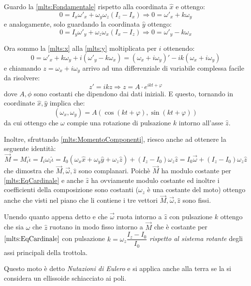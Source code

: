 \documentclass[../main.tex]{subfiles}
\begin{document}
Guardo la \cref{mlts:Fondamentale} rispetto alla coordinata $\hat x$ e ottengo:
\begin{equation}\label{mlts:x}
	0=I_x\omega'_x+\omega_y\omega_z(I_z-I_x)\Rightarrow 0=\omega'_x+k\omega_y
\end{equation}
e analogamente, solo guardando la coordinata $\hat y$ ottengo:
\begin{equation}\label{mlts:y}
	0=I_y\omega'_y+\omega_z\omega_x(I_x-I_z)\Rightarrow 0=\omega'_y-k\omega_x
\end{equation}

Ora sommo la \cref{mlts:x} alla \cref{mlts:y} moltiplicata per $i$ ottenendo:
\begin{equation*}
	0=\omega'_x+k\omega_y+i(\omega'_y-k\omega_x)=(\omega_x+i\omega_y)'-ik(\omega_x+i\omega_y)
\end{equation*}
e chiamando $z=\omega_x+i\omega_y$ arrivo ad una differenziale di variabile complessa facile da risolvere:
\begin{equation*}
	z'=ikz \Rightarrow z=A\cdot e^{ikt+\varphi}
\end{equation*}
dove $A,\phi$ sono costanti che dipendono dai dati iniziali. E questo, tornando in coordinate $\hat x,\hat y$ implica che:
\begin{equation}\label{mlts:MotoOmega}
	(\omega_x,\omega_y)=A(\cos(kt+\varphi),\sin(kt+\varphi))
\end{equation}
da cui ottengo che $\omega$ compie una rotazione di pulsazione $k$ intorno all'asse $\hat z$.

Inoltre, sfruttando \cref{mlts:MomentoComponenti}, riesco anche ad ottenere la seguente identità:
\begin{equation}\label{mlts:Complanarita}
	\overrightarrow M = M_i\hat\iota = I_i \omega_i\hat\iota= 
	I_0\left(\omega_x\hat x+\omega_y\hat y+\omega_z\hat z\right)+(I_z-I_0)\omega_z \hat z=
	I_0\vec\omega + (I_z-I_0)\omega_z \hat z
\end{equation}
che dimostra che $\overrightarrow{M},\vec\omega,\hat z$ sono complanari. Poichè $\vec M$ ha modulo costante per \cref{mlts:EqCardinale} e anche $\hat z$ ha ovviamente modulo costante ed inoltre i coefficienti della composizione sono costanti ($\omega_z$ è una costante del moto) ottengo anche che visti nel piano che li contiene i tre vettori $\overrightarrow M, \vec\omega, \hat z$ sono fissi.

Unendo quanto appena detto e che $\vec\omega$ ruota intorno a $\hat z$ con pulsazione $k$ ottengo che sia $\omega$ che $\hat z$ ruotano in modo fisso intorno a $\vec M$ che è costante per $\cref{mlts:EqCardinale}$ con pulsazione $k=\omega_z\dfrac{I_z-I_0}{I_0}$ \emph{rispetto al sistema rotante} degli assi principali della trottola.

Questo moto è detto \emph{Nutazioni di Eulero} e si applica anche alla terra se la si considera un ellissoide schiacciato ai poli.
\end{document}
